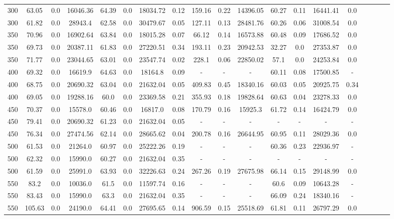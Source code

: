 \begin{sidewaystable}[!h]
\begin{tabular}{lcccccccccccccccccc}
300 & 63.05 & 0.0 & 16046.36 & 64.39 & 0.0 & 18034.72 & 0.12 & 159.16 & 0.22 & 14396.05 & 60.27 & 0.11 & 16441.41 & 0.0 \\
300 & 61.82 & 0.0 & 28943.4 & 62.58 & 0.0 & 30479.67 & 0.05 & 127.11 & 0.13 & 28481.76 & 60.26 & 0.06 & 31008.54 & 0.0 \\
350 & 70.96 & 0.0 & 16902.64 & 63.84 & 0.0 & 18015.28 & 0.07 & 66.12 & 0.14 & 16573.88 & 60.48 & 0.09 & 17686.52 & 0.0 \\
350 & 69.73 & 0.0 & 20387.11 & 61.83 & 0.0 & 27220.51 & 0.34 & 193.11 & 0.23 & 20942.53 & 32.27 & 0.0 & 27353.87 & 0.0 \\
350 & 71.77 & 0.0 & 23044.65 & 63.01 & 0.0 & 23547.74 & 0.02 & 228.1 & 0.06 & 22850.02 & 57.1 & 0.0 & 24253.84 & 0.0 \\
400 & 69.32 & 0.0 & 16619.9 & 64.63 & 0.0 & 18164.8 & 0.09 & - & - & - & 60.11 & 0.08 & 17500.85 &  - \\
400 & 68.75 & 0.0 & 20690.32 & 63.04 & 0.0 & 21632.04 & 0.05 & 409.83 & 0.45 & 18340.16 & 60.03 & 0.05 & 20925.75 & 0.34 \\
400 & 69.05 & 0.0 & 19288.16 & 60.0 & 0.0 & 23369.58 & 0.21 & 355.93 & 0.18 & 19828.64 & 60.63 & 0.04 & 23278.33 & 0.0 \\
450 & 70.37 & 0.0 & 15578.0 & 60.46 & 0.0 & 16817.0 & 0.08 & 170.79 & 0.16 & 15925.3 & 61.72 & 0.14 & 16424.79 & 0.0 \\
450 & 79.41 & 0.0 & 20690.32 & 61.23 & 0.0 & 21632.04 & 0.05 & - & - & - & - & - & - & - \\
450 & 76.34 & 0.0 & 27474.56 & 62.14 & 0.0 & 28665.62 & 0.04 & 200.78 & 0.16 & 26644.95 & 60.95 & 0.11 & 28029.36 & 0.0 \\
500 & 61.53 & 0.0 & 21264.0 & 60.97 & 0.0 & 25222.26 & 0.19 & - & - & - & 60.36 & 0.23 & 22936.97 &  - \\
500 & 62.32 & 0.0 & 15990.0 & 60.27 & 0.0 & 21632.04 & 0.35 & - & - & - & - & - & - & - \\
500 & 61.59 & 0.0 & 25991.0 & 63.93 & 0.0 & 32226.63 & 0.24 & 267.26 & 0.19 & 27675.98 & 66.14 & 0.15 & 29148.99 & 0.0 \\
550 & 83.2 & 0.0 & 10036.0 & 61.5 & 0.0 & 11597.74 & 0.16 & - & - & - & 60.6 & 0.09 & 10643.28 &  - \\
550 & 83.43 & 0.0 & 15990.0 & 63.3 & 0.0 & 21632.04 & 0.35 & - & - & - & 66.09 & 0.24 & 18340.16 &  - \\
550 & 105.63 & 0.0 & 24190.0 & 64.41 & 0.0 & 27695.65 & 0.14 & 906.59 & 0.15 & 25518.69 & 61.81 & 0.11 & 26797.29 & 0.0 \\

\end{tabular}
\end{sidewaystable}
